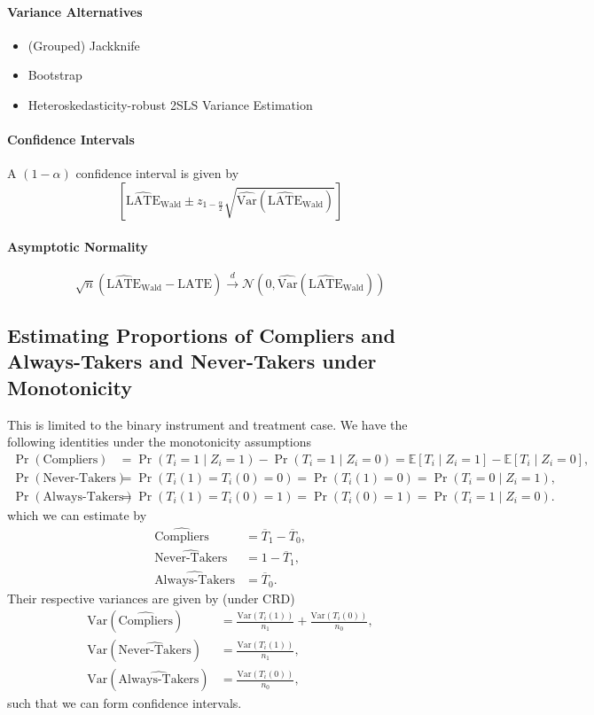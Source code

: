 \documentclass[11pt]{exam}
\theoremstyle{plain}
\newcommand{\indist}{\overset{d}{\to}}
\newcommand{\E}{\mathbb{E}}
\newcommand{\LATE}{\mathrm{LATE}}
\newcommand{\Var}{\mathrm{Var}}
\newcommand{\Nb}[1]{\mathcal{N}{\left( #1 \right)}}
\begin{document}
\paragraph{Variance Alternatives}
\begin{itemize}
    \item (Grouped) Jackknife
    \item Bootstrap
    \item Heteroskedasticity-robust 2SLS Variance Estimation
\end{itemize}

\paragraph{Confidence Intervals}
A $(1-\alpha)$ confidence interval is given by
\[
    [\widehat{\LATE}_{\text{Wald}} \pm z_{1-\frac{\alpha}{2}} \sqrt{\widehat{\Var}\!\left(\widehat{\LATE}_{\text{Wald}}\right)}]
\]

\paragraph{Asymptotic Normality}
\[
    \sqrt{n}\left(\widehat{\LATE}_{\text{Wald}} - \LATE\right) \indist \Nb{0, \widehat{\Var}\!\left(\widehat{\LATE}_{\text{Wald}}\right)}
\]

\subsection{Estimating Proportions of Compliers and Always-Takers and Never-Takers under Monotonicity}
This is limited to the binary instrument and treatment case. We have the following identities under the monotonicity assumptions
\begin{align*}
    \Pr(\text{Compliers}) &= \Pr(T_i = 1 \mid Z_i = 1) - \Pr(T_i = 1 \mid Z_i = 0) = \E[T_i \mid Z_i = 1] - \E[T_i \mid Z_i = 0],
    \\
    \Pr(\text{Never-Takers}) &= \Pr(T_i(1) = T_i(0) = 0) = \Pr(T_i(1) = 0) = \Pr(T_i = 0 \mid Z_i = 1),
    \\
    \Pr(\text{Always-Takers}) &= \Pr(T_i(1) = T_i(0) = 1) = \Pr(T_i(0) = 1) = \Pr(T_i = 1 \mid Z_i = 0).
\end{align*}
which we can estimate by
\begin{align*}
    \widehat{\text{Compliers}} &= \overline{T}_1 - \overline{T}_0,
    \\
    \widehat{\text{Never-Takers}} &= 1 - \overline{T}_1,
     \\
    \widehat{\text{Always-Takers}} &= \overline{T}_0.
\end{align*}
Their respective variances are given by (under CRD)
\begin{align*}
    \Var(\widehat{\text{Compliers}}) &= \frac{\Var(T_i(1))}{n_1} + \frac{\Var(T_i(0))}{n_0},
    \\
    \Var(\widehat{\text{Never-Takers}}) &= \frac{\Var(T_i(1))}{n_1},
    \\
    \Var(\widehat{\text{Always-Takers}}) &= \frac{\Var(T_i(0))}{n_0},
\end{align*}
such that we can form confidence intervals.
\end{document}

